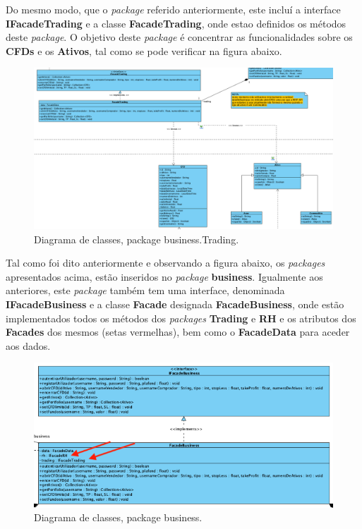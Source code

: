 \documentclass[11pt,a4paper]{report}%
\begin{document}
Do mesmo modo, que o \emph{package} referido anteriormente, este incluí a interface \textbf{IFacadeTrading} e a classe \textbf{FacadeTrading}, onde estao definidos os métodos deste \emph{package}. O objetivo deste \emph{package} é concentrar as funcionalidades sobre os \textbf{CFDs} e os \textbf{Ativos}, tal como se pode verificar na figura abaixo. 

\begin{figure}[H]
	\centering
	\includegraphics[scale=0.5]{diagrama-classes-3.png}
	\caption{Diagrama de classes, package business.Trading. }
	\label{img:pag}
\end{figure}

Tal como foi dito anteriormente e observando a figura abaixo, os \emph{packages} apresentados acima, estão inseridos no \emph{package} \textbf{business}. Igualmente aos anteriores, este \emph{package} também tem uma interface, denominada \textbf{IFacadeBusiness} e a classe \textbf{Facade} designada \textbf{FacadeBusiness}, onde estão implementados todos os métodos dos \emph{packages} \textbf{Trading} e \textbf{RH} e os atributos dos \textbf{Facades} dos mesmos (setas vermelhas), bem como o \textbf{FacadeData} para aceder aos dados.

\begin{figure}[H]
	\centering
	\includegraphics[scale=0.5]{diagrama-classes-4.png}
	\caption{Diagrama de classes, package business. }
	\label{img:pag}
\end{figure}
\end{document}
